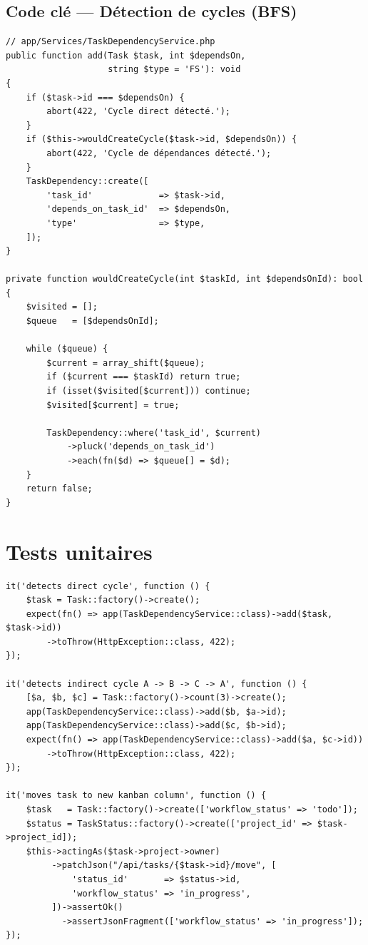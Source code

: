 \subsection{Code clé — Détection de cycles (BFS)}

\begin{lstlisting}[style=phpstyle,caption={TaskDependencyService — Détection de cycle BFS},label={lst:cycle_bfs}]
// app/Services/TaskDependencyService.php
public function add(Task $task, int $dependsOn,
                    string $type = 'FS'): void
{
    if ($task->id === $dependsOn) {
        abort(422, 'Cycle direct détecté.');
    }
    if ($this->wouldCreateCycle($task->id, $dependsOn)) {
        abort(422, 'Cycle de dépendances détecté.');
    }
    TaskDependency::create([
        'task_id'             => $task->id,
        'depends_on_task_id'  => $dependsOn,
        'type'                => $type,
    ]);
}

private function wouldCreateCycle(int $taskId, int $dependsOnId): bool
{
    $visited = [];
    $queue   = [$dependsOnId];

    while ($queue) {
        $current = array_shift($queue);
        if ($current === $taskId) return true;
        if (isset($visited[$current])) continue;
        $visited[$current] = true;

        TaskDependency::where('task_id', $current)
            ->pluck('depends_on_task_id')
            ->each(fn($d) => $queue[] = $d);
    }
    return false;
}
\end{lstlisting}

\section{Tests unitaires}

\begin{lstlisting}[style=phpstyle,caption={Tests unitaires — Dépendances et Kanban},label={lst:tests_s3}]
it('detects direct cycle', function () {
    $task = Task::factory()->create();
    expect(fn() => app(TaskDependencyService::class)->add($task, $task->id))
        ->toThrow(HttpException::class, 422);
});

it('detects indirect cycle A -> B -> C -> A', function () {
    [$a, $b, $c] = Task::factory()->count(3)->create();
    app(TaskDependencyService::class)->add($b, $a->id);
    app(TaskDependencyService::class)->add($c, $b->id);
    expect(fn() => app(TaskDependencyService::class)->add($a, $c->id))
        ->toThrow(HttpException::class, 422);
});

it('moves task to new kanban column', function () {
    $task   = Task::factory()->create(['workflow_status' => 'todo']);
    $status = TaskStatus::factory()->create(['project_id' => $task->project_id]);
    $this->actingAs($task->project->owner)
         ->patchJson("/api/tasks/{$task->id}/move", [
             'status_id'       => $status->id,
             'workflow_status' => 'in_progress',
         ])->assertOk()
           ->assertJsonFragment(['workflow_status' => 'in_progress']);
});
\end{lstlisting}


